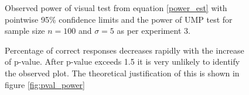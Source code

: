\documentclass{article}
\begin{document}
\begin{figure}[hbtp]
   \centering
       \caption{Observed power of visual test from equation \eqref{power_est} with pointwise 95\% confidence limits and the power of UMP test for sample size $n= 100$ and $\sigma = 5$ as per experiment 3. }
       \label{fig:power_observed_exp3}
\end{figure}


\begin{figure}[hbtp]
   \centering
       \caption{Percentage of correct responses decreases rapidly with the increase of p-value. After p-value exceeds 1.5 it is very unlikely to identify the observed plot. The theoretical justification of this is shown in figure \ref{fig:pval_power}}
       \label{fig:pval_pcorrect}
\end{figure}
\end{document}

